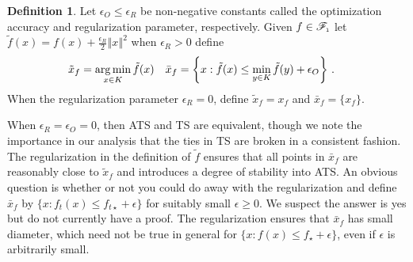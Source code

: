 \documentclass[letter, 12pt]{report}
\newcommand{\epsR}{{\epsilon_R}}
\newcommand{\epsO}{{\epsilon_O}}
\newcommand{\pl}{\text{\tiny\texttt{l}}}
\newcommand{\argmin}{\operatornamewithlimits{arg\,min}}
\newcommand{\norm}[1]{\left \Vert  #1 \right \Vert}
\newcommand{\sF}{\mathscr F}
\newcommand{\1}{\mathbf{1}}
\newcommand{\ts}{\textsc{TS}\xspace}
\newcommand{\ats}{\textsc{ATS}}
\theoremstyle{plain}
\theoremstyle{definition}
\newtheorem{definition}[theorem]{Definition}
\theoremstyle{remark}
\begin{document}
\begin{definition}\label{def:opt}
    Let $\epsO \leq \epsR$ be non-negative constants called the optimization accuracy and regularization parameter, respectively.
    Given $f \in \sF_{\pl}$ let $\tilde f(x) = f(x) + \frac{\epsR}{2} \norm{x}^2$ when $\epsR > 0$ define
    \begin{align*}
        \tilde x_f & = \argmin_{x \in K} \tilde f(x)                                              &
        \bar x_f   & = \left\{x : \tilde f(x) \leq \min_{y \in K} \tilde f(y) + \epsO\right\} \,.
    \end{align*}
    When the regularization parameter $\epsR = 0$, define
    $\tilde x_f = x_f$
    and $\bar x_f = \{x_f\}$.
\end{definition}

When $\epsR = \epsO = 0$, then \ats{} and \ts{} are equivalent, though we note the importance in our analysis
that the ties in \ts{} are broken in a consistent fashion.
The regularization in the definition of $\tilde f$ ensures that all points in $\bar x_f$ are reasonably close to $\tilde x_f$ and introduces
a degree of stability into \ats{}.
An obvious question is whether or not you could do away with the regularization and define $\bar x_f$ by  $\{x : f_t(x) \leq f_{t\star} + \epsilon\}$
for suitably small $\epsilon \geq 0$.
We suspect the answer is yes but do not currently have a proof.
The regularization ensures that $\bar x_f$ has small diameter, which need not be true in general for $\{x : f(x) \leq f_\star + \epsilon\}$,
even if $\epsilon$ is arbitrarily small.
\end{document}
